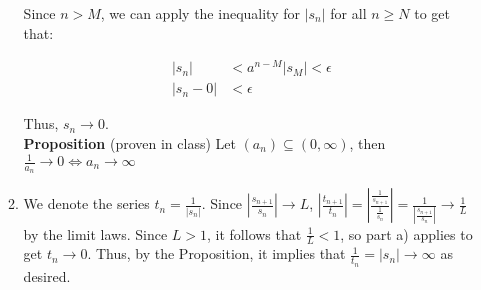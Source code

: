 \documentclass{article}
\begin{document}
\begin{enumerate}
\begin{enumerate}[label=(\alph*)]
    Since $n > M$, we can apply the inequality for $|s_n|$ for all $n \geq N$ to get that:

    \begin{align*}
     |s_n| & < a^{n - M}|s_M| < \epsilon \\
    |s_n - 0| &< \epsilon
    \end{align*}

    Thus, $s_n \rightarrow 0$. \\


    \textbf{Proposition} (proven in class) Let $(a_n) \subseteq (0, \infty)$, then $\frac{1}{a_n} \rightarrow 0 \iff a_n \rightarrow \infty$\\

    \item
    We denote the series $t_n = \frac{1}{|s_n|}$. Since $|\frac{s_{n+1}}{s_n}| \rightarrow L$, $|\frac{t_{n+1}}{t_n}| = |\frac{\frac{1}{s_{n + 1}}}{\frac{1}{s_{n}} }| = \frac{1}{|\frac{s_{n+1}}{s_n}|} \rightarrow \frac{1}{L}$ by the limit laws. Since $L > 1$, it follows that $\frac{1}{L} < 1$, so part a) applies to get $t_n \rightarrow 0$. Thus, by the Proposition, it implies that $\frac{1}{t_n} = |s_n| \rightarrow \infty$ as desired. 

    

    

    
    \end{enumerate}
\end{enumerate}
\end{document}
